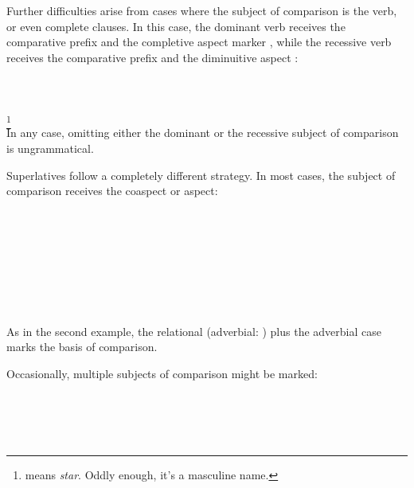 \documentclass{book}
\begin{document}
Further difficulties arise from cases where the subject of comparison is the verb, or even complete clauses. In this case, the dominant verb receives the comparative prefix  and the completive aspect marker , while the recessive verb receives the comparative prefix and the diminuitive aspect : \\
~\\
     \\
     \\
     \footnote{ means \emph{star}. Oddly enough, it's a masculine name.} \\

In any case, omitting either the dominant or the recessive subject of comparison is ungrammatical.

Superlatives follow a completely different strategy. In most cases, the subject of comparison receives the  coaspect or aspect: \\
~\\
    \\
    \\
    \\
~\\
   \\
   \\
   \\

As in the second example, the relational  (adverbial: ) plus the adverbial case marks the basis of comparison.

Occasionally, multiple subjects of comparison might be marked: \\
~\\
   \\
   \\
   \\
\end{document}
